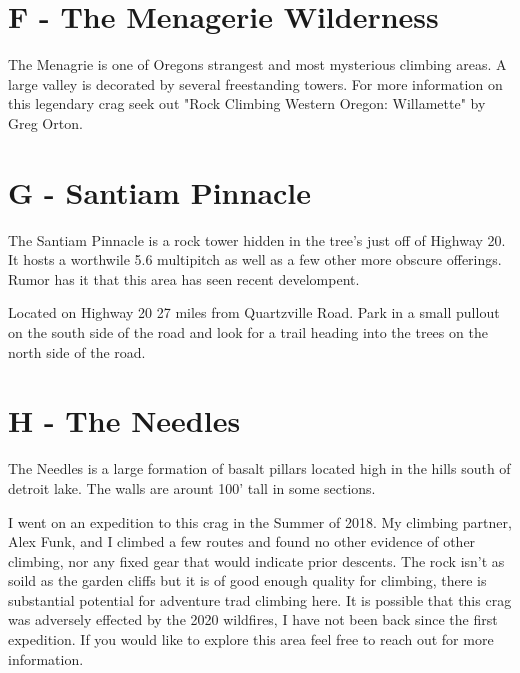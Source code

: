 \begin{multicols}{2}
\needspace{5cm}

\section{F - The Menagerie Wilderness}\label{sa:The Menagerie Wilderness}
The Menagrie is one of Oregons strangest and most mysterious climbing areas. A large valley is decorated by several freestanding towers. For more information on this legendary crag seek out "Rock Climbing Western Oregon: Willamette" by Greg Orton.\\




\needspace{5cm}

\section{G - Santiam Pinnacle}\label{sa:Santiam Pinnacle}
The Santiam Pinnacle is a rock tower hidden in the tree's just off of Highway 20. It hosts a worthwile 5.6 multipitch as well as a few other more obscure offerings. Rumor has it that this area has seen recent develompent.

Located on Highway 20 27 miles from Quartzville Road. Park in a small pullout on the south side of the road and look for a trail heading into the trees on the north side of the road.\\




\needspace{5cm}

\section{H - The Needles}\label{sa:The Needles}
The Needles is a large formation of basalt pillars located high in the hills south of detroit lake. The walls are arount 100' tall in some sections.

I went on an expedition to this crag in the Summer of 2018. My climbing partner, Alex Funk, and I climbed a few routes and found no other evidence of other climbing, nor any fixed gear that would indicate prior descents. The rock isn't as soild as the garden cliffs but it is of good enough quality for climbing, there is substantial potential for adventure trad climbing here. It is possible that this crag was adversely effected by the 2020 wildfires, I have not been back since the first expedition. If you would like to explore this area feel free to reach out for more information.\\





\end{multicols}
\clearpage